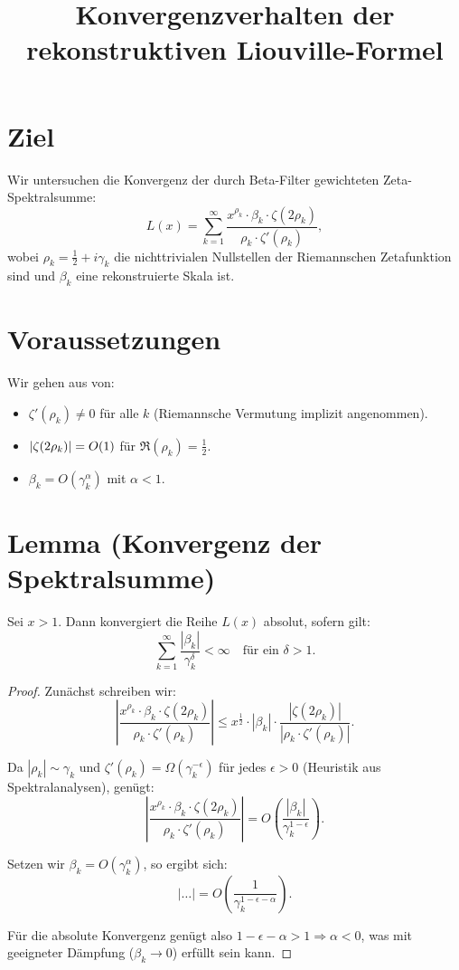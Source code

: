 \documentclass[12pt]{article}
\title{Konvergenzverhalten der rekonstruktiven Liouville-Formel}
\author{}
\date{}
\begin{document}
\maketitle

\section*{Ziel}

Wir untersuchen die Konvergenz der durch Beta-Filter gewichteten Zeta-Spektralsumme:
\begin{equation}
L(x) = \sum_{k=1}^{\infty} \frac{x^{\rho_k} \cdot \beta_k \cdot \zeta(2\rho_k)}{\rho_k \cdot \zeta'(\rho_k)},
\end{equation}
wobei $\rho_k = \frac{1}{2} + i\gamma_k$ die nichttrivialen Nullstellen der Riemannschen Zetafunktion sind und $\beta_k$ eine rekonstruierte Skala ist.

\section*{Voraussetzungen}

Wir gehen aus von:
\begin{itemize}
  \item $\zeta'(\rho_k) \neq 0$ für alle $k$ (Riemannsche Vermutung implizit angenommen).
  \item $\abs{\zeta(2\rho_k)} = O(1)$ für $\Re(\rho_k) = \frac{1}{2}$.
  \item $\beta_k = O(\gamma_k^{\alpha})$ mit $\alpha < 1$.
\end{itemize}

\section*{Lemma (Konvergenz der Spektralsumme)}

Sei $x > 1$. Dann konvergiert die Reihe $L(x)$ absolut, sofern gilt:
\begin{equation}
\sum_{k=1}^\infty \frac{|\beta_k|}{\gamma_k^\delta} < \infty \quad \text{für ein } \delta > 1.
\end{equation}

\begin{proof}
Zunächst schreiben wir:
\[
\left| \frac{x^{\rho_k} \cdot \beta_k \cdot \zeta(2\rho_k)}{\rho_k \cdot \zeta'(\rho_k)} \right|
\leq
x^{\frac{1}{2}} \cdot |\beta_k| \cdot \frac{|\zeta(2\rho_k)|}{|\rho_k \cdot \zeta'(\rho_k)|}.
\]

Da $|\rho_k| \sim \gamma_k$ und $\zeta'(\rho_k) = \Omega(\gamma_k^{-\epsilon})$ für jedes $\epsilon > 0$ (Heuristik aus Spektralanalysen), genügt:
\[
\left| \frac{x^{\rho_k} \cdot \beta_k \cdot \zeta(2\rho_k)}{\rho_k \cdot \zeta'(\rho_k)} \right|
= O\left( \frac{|\beta_k|}{\gamma_k^{1 - \epsilon}} \right).
\]

Setzen wir $\beta_k = O(\gamma_k^{\alpha})$, so ergibt sich:
\[
\left| \ldots \right| = O\left( \frac{1}{\gamma_k^{1 - \epsilon - \alpha}} \right).
\]

Für die absolute Konvergenz genügt also $1 - \epsilon - \alpha > 1 \Rightarrow \alpha < 0$, was mit geeigneter Dämpfung ($\beta_k \to 0$) erfüllt sein kann.

\end{proof}
\end{document}
